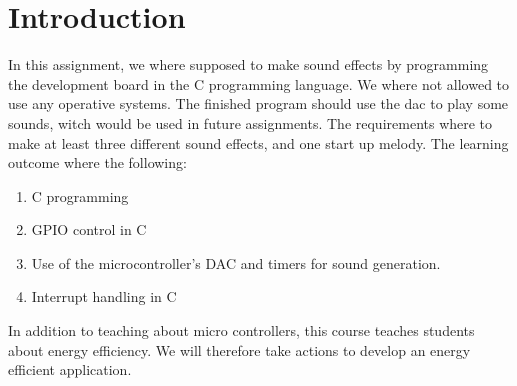 \section{Introduction}
In this assignment, we where supposed to make sound effects by programming the development board in the C programming language. We where not allowed to use any operative systems. The finished program should use the dac to play some sounds, witch would be used in future assignments. The requirements where to make at least three different sound effects, and one start up melody. The learning outcome where the following:
\begin{enumerate}
	\item{C programming}
	\item{GPIO control in C}
	\item{Use of the microcontroller's DAC and timers for sound generation.}
	\item{Interrupt handling in C}
\end{enumerate}
In addition to teaching about micro controllers, this course teaches students about energy efficiency. We will therefore take actions to develop an energy efficient application. 
